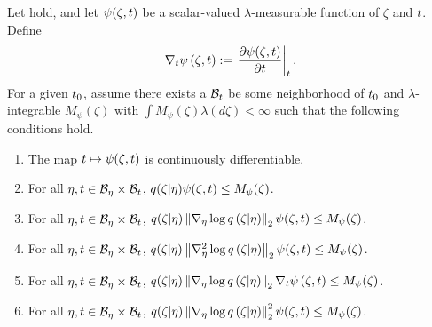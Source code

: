 \begin{assu}
%
Let  hold, and let $\psi(\zeta, t)$ be a scalar-valued
$\lambda$-measurable function of $\zeta$ and $t$.  Define
%
\begin{align*}
%
\psigrad{\zeta, \t} := \fracat{\partial \psi(\zeta, \t)}{\partial \t}{\t}.
%
\end{align*}
%
For a given $t_0$, assume
there exists a $\mathcal{B}_t$ be some neighborhood of $t_0$ and
$\lambda$-integrable $M_\psi(\zeta)$ with $\int M_\psi(\zeta) \lambda(d\zeta) <
\infty$ such that the following conditions hold.
%
\begin{enumerate}
%
\item  {} The map $t \mapsto \psi(\zeta, t)$ is
continuously differentiable.
%
\item {} For all $\eta, t \in \mathcal{B}_\eta \times \mathcal{B}_t$,
$q(\zeta \vert \eta) \psi(\zeta, t) \le M_\psi(\zeta)$.
%
\item {} For all $\eta, t \in \mathcal{B}_\eta \times \mathcal{B}_t$,
$q(\zeta \vert \eta) \left\Vert{\nabla_\eta \log q}\left(\zeta \vert \eta\right)\right\Vert_2 \psi(\zeta, t) \le
M_\psi(\zeta)$.
%
\item {} For all $\eta, t \in \mathcal{B}_\eta \times \mathcal{B}_t$,
$q(\zeta \vert \eta) \left\Vert{\nabla_\eta^2 \log q}\left(\zeta \vert \eta\right)\right\Vert_2 \psi(\zeta, t) \le
M_\psi(\zeta)$.
%
\item {} For all $\eta, t \in \mathcal{B}_\eta \times \mathcal{B}_t$,
$q(\zeta \vert \eta) \left\Vert{\nabla_\eta \log q}\left(\zeta \vert \eta\right)\right\Vert_2 {\nabla_t \psi}\left(\zeta, t\right)
\le M_\psi(\zeta)$.
%
\item {} For all $\eta, t \in \mathcal{B}_\eta \times \mathcal{B}_t$,
$q(\zeta \vert \eta) \left\Vert{\nabla_\eta \log q}\left(\zeta \vert \eta\right)\right\Vert^2_2 \psi(\zeta, t) \le
M_\psi(\zeta)$.
%
\end{enumerate}
%
\end{assu}

%

